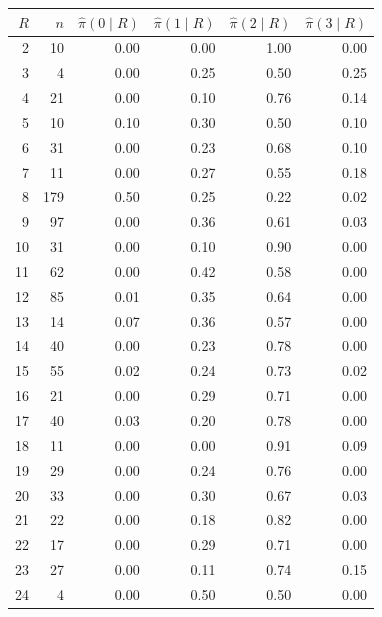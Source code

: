 \begin{tabular}{rrrrrr}
\toprule
$R$ & $n$ & $\hat\pi(0\mid R)$ & $\hat\pi(1\mid R)$ & $\hat\pi(2\mid R)$ & $\hat\pi(3\mid R)$ \\
\midrule
2 & 10 & 0.00 & 0.00 & 1.00 & 0.00 \\
3 & 4 & 0.00 & 0.25 & 0.50 & 0.25 \\
4 & 21 & 0.00 & 0.10 & 0.76 & 0.14 \\
5 & 10 & 0.10 & 0.30 & 0.50 & 0.10 \\
6 & 31 & 0.00 & 0.23 & 0.68 & 0.10 \\
7 & 11 & 0.00 & 0.27 & 0.55 & 0.18 \\
8 & 179 & 0.50 & 0.25 & 0.22 & 0.02 \\
9 & 97 & 0.00 & 0.36 & 0.61 & 0.03 \\
10 & 31 & 0.00 & 0.10 & 0.90 & 0.00 \\
11 & 62 & 0.00 & 0.42 & 0.58 & 0.00 \\
12 & 85 & 0.01 & 0.35 & 0.64 & 0.00 \\
13 & 14 & 0.07 & 0.36 & 0.57 & 0.00 \\
14 & 40 & 0.00 & 0.23 & 0.78 & 0.00 \\
15 & 55 & 0.02 & 0.24 & 0.73 & 0.02 \\
16 & 21 & 0.00 & 0.29 & 0.71 & 0.00 \\
17 & 40 & 0.03 & 0.20 & 0.78 & 0.00 \\
18 & 11 & 0.00 & 0.00 & 0.91 & 0.09 \\
19 & 29 & 0.00 & 0.24 & 0.76 & 0.00 \\
20 & 33 & 0.00 & 0.30 & 0.67 & 0.03 \\
21 & 22 & 0.00 & 0.18 & 0.82 & 0.00 \\
22 & 17 & 0.00 & 0.29 & 0.71 & 0.00 \\
23 & 27 & 0.00 & 0.11 & 0.74 & 0.15 \\
24 & 4 & 0.00 & 0.50 & 0.50 & 0.00 \\
\bottomrule
\end{tabular}
